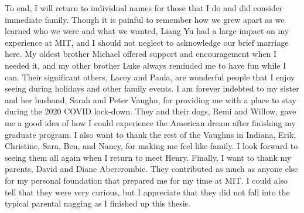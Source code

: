 To end, I will return to individual names for those that I do and did consider immediate family.
Though it is painful to remember how we grew apart as we learned who we were and what we wanted,
Liang Yu had a large impact on my experience at MIT,
and I should not neglect to acknowledge our brief marriage here.
My oldest brother Michael offered support and encouragement when I needed it, and
my other brother Luke always reminded me to have fun while I can.
Their significant others, Lacey and Paula, are wonderful people that I enjoy seeing during
holidays and other family events.
I am forever indebted to my sister and her husband, Sarah and Peter Vaughn,
for providing me with a place to stay during the 2020 COVID lock-down.
They and their dogs, Remi and Willow, gave me a good idea of how I could experience
the American dream after finishing my graduate program.
I also want to thank the rest of the Vaughns in Indiana,
Erik, Christine, Sara, Ben, and Nancy, for making me feel like family.
I look forward to seeing them all again when I return to meet Henry.
Finally, I want to thank my parents, David and Diane Abercrombie.
They contributed as much as anyone else for my personal foundation that
prepared me for my time at MIT.
I could also tell that they were very curious, but I appreciate that
they did not fall into the typical parental nagging as I finished up this thesis.

